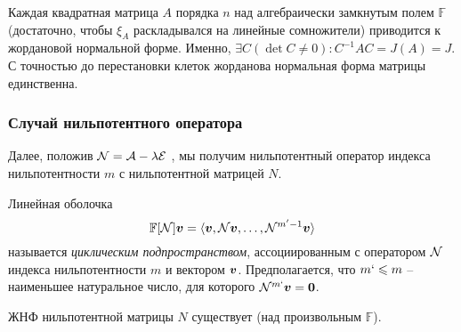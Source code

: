 

\begin{to_thr} 
    Каждая квадратная матрица $A$ порядка $n$ над алгебраически замкнутым полем $\mathbb{F}$ (достаточно, чтобы $\xi_{A}$ раскладывался на линейные сомножители) приводится к жордановой нормальной форме. Именно, $\exists C (\det C \neq 0) \colon C^{-1} A C = J(A) = J$. С точностью до перестановки клеток жорданова нормальная форма матрицы единственна. 
\end{to_thr}


\subsubsection{Случай нильпотентного оператора}

Далее, положив $\N = \A - \lambda \mathcal E$ , мы получим нильпотентный оператор индекса нильпотентности $m$ с нильпотентной матрицей $N$.

\begin{to_def} 
    Линейная оболочка 
$$
    \mathbb{F}[\N] \vc{v} = \langle \vc{v}, \N \vc{v}, \ldots, \N^{m'-1} \vc{v}\rangle
$$
называется \textit{циклическим подпространством}, ассоциированным с оператором $\N$ индекса нильпотентности $m$ и вектором $\vc{v}$. Предполагается, что $m` \leq m$ -- наименьшее натуральное число, для которого $\N^{m`} \vc{v} = \vc{0}$.
\end{to_def}

\begin{to_thr} 
    ЖНФ нильпотентной матрицы $N$ существует (над произвольным $\mathbb{F}$).
\end{to_thr}


